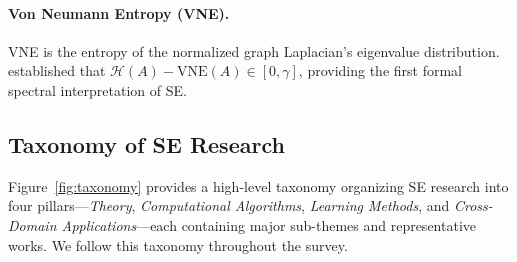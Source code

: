 \paragraph{Von Neumann Entropy (VNE).}
VNE is the entropy of the normalized graph Laplacian's eigenvalue
distribution.
\cite{liu2022similaritygap} established that
$\mathcal{H}(A) - \mathrm{VNE}(A) \in [0,\gamma]$, providing the first
formal spectral interpretation of SE.

\subsection{Taxonomy of SE Research}
\label{subsec:taxonomy}

Figure~\ref{fig:taxonomy} provides a high-level taxonomy organizing SE
research into four pillars---\emph{Theory}, \emph{Computational Algorithms},
\emph{Learning Methods}, and \emph{Cross-Domain Applications}---each
containing major sub-themes and representative works.
We follow this taxonomy throughout the survey.


